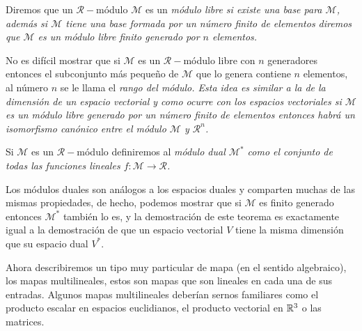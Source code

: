 \begin{definition}
	Diremos que un $\mathcal{R}-$módulo $\mathcal{M}$ es un \it{módulo libre} si existe una base para $\mathcal{M}$, además si $\mathcal{M}$ tiene una base formada por un número finito de elementos diremos que $\mathcal{M}$ es un \it{módulo libre finito generado por $n$ elementos}.
\end{definition}

No es difícil mostrar que si $\mathcal{M}$ es un $\mathcal{R}-$módulo libre con $n$ generadores entonces el subconjunto más pequeño de $\mathcal{M}$ que lo genera contiene $n$ elementos, al número $n$ se le llama el \it{rango} del módulo. Esta idea es similar a la de la dimensión de un espacio vectorial y como ocurre con los espacios vectoriales si $\mathcal{M}$ es un módulo libre generado por un número finito de elementos entonces habrá un isomorfismo canónico entre el módulo $\mathcal{M}$ y $\mathcal{R}^n$.

\begin{definition}
	Si $\mathcal{M}$ es un $\mathcal{R}-$módulo definiremos al \it{módulo dual $\mathcal{M}^{*}$} como el conjunto de todas las funciones lineales $f: \mathcal{M} \to \mathcal{R}$.
\end{definition}

Los módulos duales son análogos a los espacios duales y comparten muchas de las mismas propiedades, de hecho, podemos mostrar que si $\mathcal{M}$ es finito generado entonces $\mathcal{M}^*$ también lo es, y la demostración de este teorema es exactamente igual a la demostración de que un espacio vectorial $V$ tiene la misma dimensión que su espacio dual $V^{*}$.

Ahora describiremos un tipo muy particular de mapa (en el sentido algebraico), los mapas multilineales, estos son mapas que son lineales en cada una de sus entradas. Algunos mapas multilineales deberían sernos familiares como el producto escalar en espacios euclidianos, el producto vectorial en $\mathbb{R}^3$ o las matrices.

